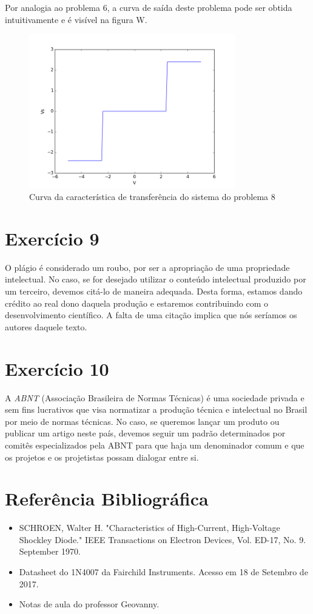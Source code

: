 \documentclass[12pt, a4paper, twoside]{article}
\begin{document}
Por analogia ao problema 6, a curva de saída deste problema pode ser obtida
intuitivamente e é visível na figura W.

\begin{figure}
    \centering
    \includegraphics[width=0.8\textwidth]{figs/rel3/ex8.png}
    \caption{Curva da característica de transferência do sistema do problema 8}
\end{figure}

\section{Exercício 9}

O plágio é considerado um roubo, por ser a apropriação de uma propriedade intelectual.
No caso, se for desejado utilizar o conteúdo intelectual produzido por um terceiro,
devemos citá-lo de maneira adequada. Desta forma, estamos dando crédito ao real dono
daquela produção e estaremos contribuindo com o desenvolvimento científico. A falta de
uma citação implica que nós seríamos os autores daquele texto.

\section{Exercício 10}

A \textit{ABNT} (Associação Brasileira de Normas Técnicas) é uma sociedade privada e
sem fins lucrativos que visa normatizar a produção técnica e intelectual no Brasil por
meio de normas técnicas. No caso, se queremos lançar um produto ou publicar um artigo
neste país, devemos seguir um padrão determinados por comitês especializados pela ABNT
para que haja um denominador comum e que os projetos e os projetistas possam dialogar
entre si.

\section{Referência Bibliográfica}

\begin{itemize}
    \item SCHROEN, Walter H. "Characteristics of High-Current, High-Voltage Shockley
    Diode." IEEE Transactions on Electron Devices, Vol. ED-17, No. 9. September 1970.
    \item Datasheet do 1N4007 da Fairchild Instruments. Acesso em 18 de Setembro de
    2017.
    \item Notas de aula do professor Geovanny.
\end{itemize}
\end{document}
